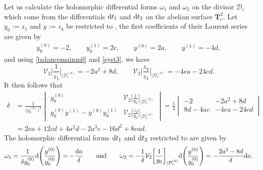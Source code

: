 \documentclass[pdftex]{sigma}
\numberwithin{equation}{section}
\begin{document}
 Let us calculate the holomorphic differential forms $\omega_1$ and
 $\omega_2$ on the divisor $\mathcal{D}_c$ which come from the differentials ${\rm d}t_1$ and ${\rm d}t_2$ on the abelian surface
 $\mathbf{T}^2_c$. Let $y_0:=z_1$ and $y:=z_4$ be
 restricted to , the first coefficients of their Laurent series are given by
 \begin{gather*}
y_0^{(0)}= -2, \qquad  y_0^{(1)}= 2c,\qquad
 y^{(0)}= 2a, \qquad  y^{(1)}=-4d,
 \end{gather*}
and using \eqref{balancemainm0} and \eqref{syst3},
 we have \[\mathcal{V}_2\biggl[\frac{1}{z_1}\biggr]_{|\mathcal{D}_c^{(0)}}=-2a^2+8d , \qquad
 \mathcal{V}_2\biggl[\frac{z_4}{z_1}\biggr]_{|\mathcal{D}_c^{(0)}}=-4ea-24cd.\]
It then follows that
\begin{align*}
 \delta &{}= \frac{1}{\bigl(y_0^{(0)}\bigr)^2}
 \begin{vmatrix}
 y_0^{(0)} & \mathcal{V}_2\bigl[\frac{1}{y_0}\bigr]_{|\mathcal{D}_c^{(0)}} \\[1mm]
 y_0^{(0)}y^{(1)}-y^{(0)}y_0^{(1)} & \mathcal{V}_2\bigl[\frac{z_4}{y_0}\bigr]_{|\mathcal{D}_c^{(0)}}
 \end{vmatrix}
 = \frac{1}{4}
 \begin{vmatrix}
 -2 & -2a^2+8d \\
 8d-4ac & -4ea-24cd \\
 \end{vmatrix}\\
 &{}= 2ea+12cd+4a^2d-2a^3c-16d^2+8cad.
\end{align*}
The holomorphic differential forms ${\rm d}t_1$ and ${\rm d}t_2$ restricted to
 are given by
\begin{gather*}
 \omega_1 = \frac{1}{\delta y_0^{(0)}}{\rm d}\Biggl(\frac{y^{(0)}}{y_0^{(0)}}\Biggr)=-\frac{{\rm d}a}{\delta }
 \qquad \text{and} \qquad
 \omega_2 = -\frac{1}{\delta }\mathcal{V}_2\biggl[\frac{1}{y_0}\biggr]_{|\mathcal{D}_c^{(0)}}
 {\rm d}\Biggl(\frac{y^{(0)}}{y_0^{(0)}}\Biggr)=-\frac{2a^2-8d}{\delta}{\rm d}a.
\end{gather*}
\end{document}
